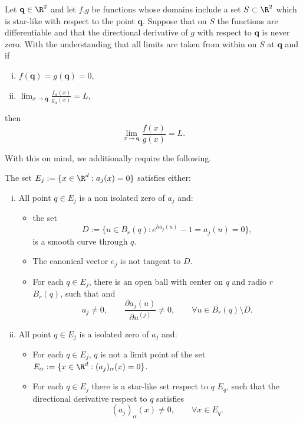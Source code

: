 \begin{thm}\label{thm:Fine}
	Let $\mathbf{q}\in \R^2$ and let $f$,$g$ be functions whose domains include a set $S\subset \R^2$ which is 
	star-like 
	with  respect to the point $\mathbf{q}$. Suppose that on $S$ the functions are differentiable and that
	the directional derivative of $g$ with respect to $\mathbf{q}$ is never zero. With the understanding that all 
	limits are taken from within on $S$ at $\mathbf{q}$ and if
	\begin{enumerate}[(i)]
		\item 
			$f(\mathbf{q})=g(\mathbf{q})=0$,
		\item
			$
				\displaystyle
				\lim_{x \to \mathbf{q}}
				\frac{f_{\alpha}(x)}{g_{\alpha}(x)} = L,	
			$
	\end{enumerate}
	then
	$$
		\lim_{x \to \mathbf{q}}
		\frac{f(x)}{g(x)} = L.
	$$
\end{thm}
%
With this on mind, we additionally require the following. 
\begin{hypothesis}\label{ass:HypThmSingularities}
	The set $E_j:=\{x\in \R^{d}: a_j(x)=0\}$ satisfies either:
	\begin{enumerate}[(i)]
		\item
			All point $q \in E_j$ is a non isolated zero of $a_j$ and:
			\begin{itemize}
				\item the set 
					$$
						D:=\{u \in B_r(q): e^{ha_j(u)}-1=a_j(u)= 0\},
					$$ 
					is a smooth curve through $q$. 
				\item
					The canonical vector $e_j$ is not
					tangent to $D$.
				\item
					For each $q \in E_j$, there is an open ball with center
					on $q$ and radio $r$ $B_r(q)$, such that  
					and
					$$
						a_j\neq 0, \qquad
						\frac{\partial a_j(u)}{\partial u^{(j)}} \neq 0 ,\qquad 
						\forall u \in B_r(q)
						\setminus D.
					$$	
			\end{itemize}	
		\item
			All point $q \in E_j$ is a isolated zero of $a_j$ and:
			\begin{itemize}
				\item
					For each $q\in E_j$,  $q$ is not a limit point of the set 
					$E_{\alpha}:=\{x \in \R^d: (a_j)_\alpha(x)=0\}$.
				\item
					For each $q \in E_j$ there is a star-like set respect to $q$ $E_q$, such that
					the directional derivative respect to $q$ satisfies
					$$
						 (a_j)_\alpha(x) \neq 0, \qquad \forall x\in E_q.
					$$
			\end{itemize}		
	\end{enumerate}	
\end{hypothesis}
